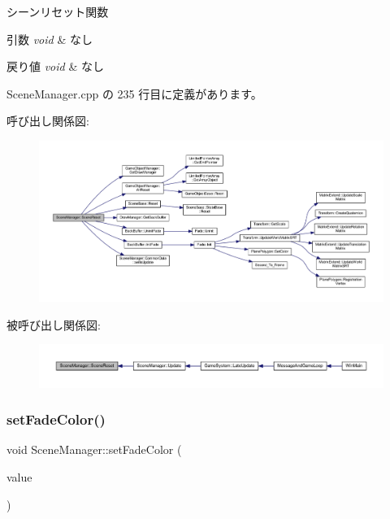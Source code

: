 シーンリセット関数 


\begin{DoxyParams}{引数}
{\em void} & なし \\
\hline
\end{DoxyParams}

\begin{DoxyRetVals}{戻り値}
{\em void} & なし \\
\hline
\end{DoxyRetVals}


 Scene\+Manager.\+cpp の 235 行目に定義があります。

呼び出し関係図\+:
\nopagebreak
\begin{figure}[H]
\begin{center}
\leavevmode
\includegraphics[width=350pt]{class_scene_manager_a0652a81c7baff52add9ec4b13205865c_cgraph}
\end{center}
\end{figure}
被呼び出し関係図\+:
\nopagebreak
\begin{figure}[H]
\begin{center}
\leavevmode
\includegraphics[width=350pt]{class_scene_manager_a0652a81c7baff52add9ec4b13205865c_icgraph}
\end{center}
\end{figure}
\mbox{\label{class_scene_manager_a24e7fa08c34ecacdca37ee35c5c39141}} 
\subsubsection{\texorpdfstring{set\+Fade\+Color()}{setFadeColor()}}
{\footnotesize\ttfamily void Scene\+Manager\+::set\+Fade\+Color (\begin{DoxyParamCaption}\item[{\mbox{\hyperlink{_vector3_d_8h_a680c30c4a07d86fe763c7e01169cd6cc}{X\+Color4}}}]{value }\end{DoxyParamCaption})\hspace{0.3cm}{\ttfamily [inline]}}



